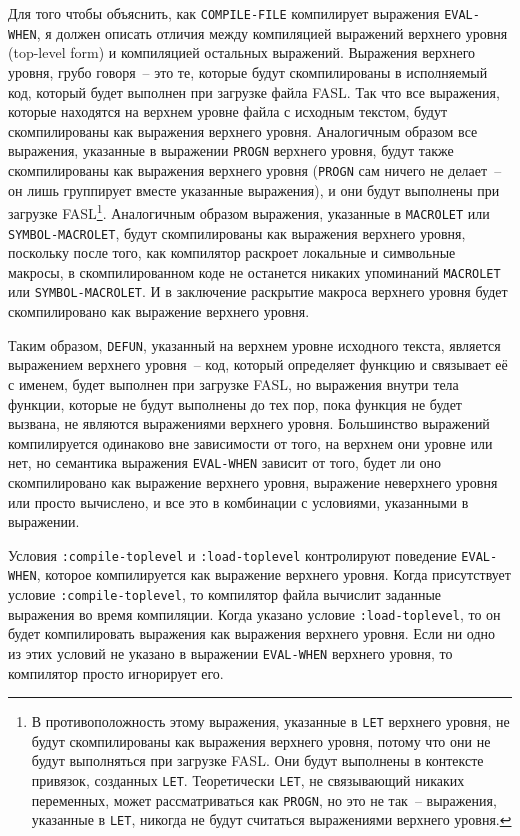 Для того чтобы объяснить, как \lstinline{COMPILE-FILE} компилирует выражения
\lstinline{EVAL-WHEN}, я должен описать отличия между компиляцией выражений верхнего
уровня (top-level form) и компиляцией остальных выражений.  Выражения верхнего уровня,
грубо говоря~-- это те, которые будут скомпилированы в исполняемый код, который будет
выполнен при загрузке файла FASL.  Так что все выражения, которые находятся на верхнем
уровне файла с исходным текстом, будут скомпилированы как выражения верхнего
уровня. Аналогичным образом все выражения, указанные в выражении \lstinline{PROGN}
верхнего уровня, будут также скомпилированы как выражения верхнего уровня
(\lstinline{PROGN} сам ничего не делает~-- он лишь группирует вместе указанные выражения),
и они будут выполнены при загрузке FASL\footnote{В противоположность этому выражения,
  указанные в \lstinline{LET} верхнего уровня, не будут скомпилированы как выражения
  верхнего уровня, потому что они не будут выполняться при загрузке FASL.  Они будут
  выполнены в контексте привязок, созданных \lstinline{LET}. Теоретически \lstinline{LET},
  не связывающий никаких переменных, может рассматриваться как \lstinline{PROGN}, но это не
  так~-- выражения, указанные в \lstinline{LET}, никогда не будут считаться выражениями
  верхнего уровня.}.  Аналогичным образом выражения, указанные в \lstinline{MACROLET} или
\lstinline{SYMBOL-MACROLET}, будут скомпилированы как выражения верхнего уровня, поскольку
после того, как компилятор раскроет локальные и символьные макросы, в скомпилированном
коде не останется никаких упоминаний \lstinline{MACROLET} или \lstinline{SYMBOL-MACROLET}.
И в заключение раскрытие макроса верхнего уровня будет скомпилировано как выражение
верхнего уровня.

Таким образом, \lstinline{DEFUN}, указанный на верхнем уровне исходного текста, является
выражением верхнего уровня~-- код, который определяет функцию и связывает её с именем,
будет выполнен при загрузке FASL, но выражения внутри тела функции, которые не будут
выполнены до тех пор, пока функция не будет вызвана, не являются выражениями верхнего
уровня.  Большинство выражений компилируется одинаково вне зависимости от того, на верхнем
они уровне или нет, но семантика выражения \lstinline{EVAL-WHEN} зависит от того, будет ли
оно скомпилировано как выражение верхнего уровня, выражение неверхнего уровня или просто
вычислено, и все это в комбинации с условиями, указанными в выражении.

Условия \lstinline{:compile-toplevel} и \lstinline{:load-toplevel} контролируют поведение
\lstinline{EVAL-WHEN}, которое компилируется как выражение верхнего уровня.  Когда присутствует
условие \lstinline{:compile-toplevel}, то компилятор файла вычислит заданные выражения во время
компиляции.  Когда указано условие \lstinline{:load-toplevel}, то он будет компилировать
выражения как выражения верхнего уровня.  Если ни одно из этих условий не указано в
выражении \lstinline{EVAL-WHEN} верхнего уровня, то компилятор просто игнорирует его.

